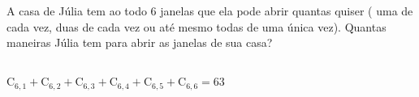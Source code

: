\begin{ex}
 A casa de Júlia tem ao todo 6 janelas que ela pode abrir quantas quiser ( uma de cada vez, duas de cada vez ou até mesmo todas de uma única vez). Quantas maneiras Júlia tem para abrir as janelas de sua casa?
  \begin{sol}
    \phantom{A}\\
    $\mathrm{C}_{6,1}+\mathrm{C}_{6,2}+\mathrm{C}_{6,3}+\mathrm{C}_{6,4}+\mathrm{C}_{6,5}+\mathrm{C}_{6,6}=63$
  \end{sol}
\end{ex}